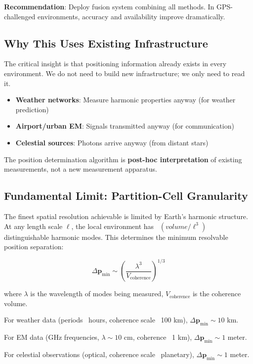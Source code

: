 \documentclass[11pt,twocolumn,a4paper]{article}
\theoremstyle{definition}
\begin{document}
\textbf{Recommendation}: Deploy fusion system combining all methods. In GPS-challenged environments, accuracy and availability improve dramatically.

\subsection{Why This Uses Existing Infrastructure}

The critical insight is that positioning information already exists in every environment. We do not need to build new infrastructure; we only need to read it.

\begin{itemize}[nosep]
\item \textbf{Weather networks}: Measure harmonic properties anyway (for weather prediction)
\item \textbf{Airport/urban EM}: Signals transmitted anyway (for communication)
\item \textbf{Celestial sources}: Photons arrive anyway (from distant stars)
\end{itemize}

The position determination algorithm is \textbf{post-hoc interpretation} of existing measurements, not a new measurement apparatus.

\subsection{Fundamental Limit: Partition-Cell Granularity}

The finest spatial resolution achievable is limited by Earth's harmonic structure. At any length scale $\ell$, the local environment has ~$(volume / \ell^3)$ distinguishable harmonic modes. This determines the minimum resolvable position separation:

\[
\Delta \mathbf{p}_{\min} \sim \left( \frac{\lambda^3}{V_{\text{coherence}}} \right)^{1/3}
\]

where $\lambda$ is the wavelength of modes being measured, $V_{\text{coherence}}$ is the coherence volume.

For weather data (periods ~hours, coherence scale ~100 km), $\Delta \mathbf{p}_{\min} \sim 10$ km.

For EM data (GHz frequencies, $\lambda \sim 10$ cm, coherence ~1 km), $\Delta \mathbf{p}_{\min} \sim 1$ meter.

For celestial observations (optical, coherence scale ~planetary), $\Delta \mathbf{p}_{\min} \sim 1$ meter.
\end{document}

